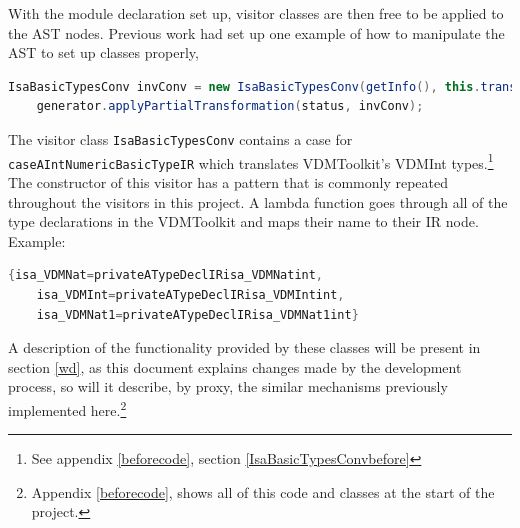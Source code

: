     With the module declaration set up, visitor classes are then free to be applied to the AST nodes. Previous work had set up one example of how to manipulate the AST to set up classes properly, 
    \begin{lstlisting}[language=Java]
    IsaBasicTypesConv invConv = new IsaBasicTypesConv(getInfo(), this.transAssistant, vdmToolkitModuleIR);
    generator.applyPartialTransformation(status, invConv);
    \end{lstlisting}
    The visitor class \lstinline[language=Java]{IsaBasicTypesConv} contains a case for \lstinline[language=Java]{caseAIntNumericBasicTypeIR} which translates VDMToolkit's VDMInt types.\footnote{See appendix \ref{beforecode}, section \ref{IsaBasicTypesConvbefore}} The constructor of this visitor has a pattern that is commonly repeated throughout the visitors in this project. A lambda function goes through all of the type declarations in the VDMToolkit and maps their name to their IR node. Example: 
	\begin{lstlisting}[language=Java]
	{isa_VDMNat=privateATypeDeclIRisa_VDMNatint,  
	isa_VDMInt=privateATypeDeclIRisa_VDMIntint, 
	isa_VDMNat1=privateATypeDeclIRisa_VDMNat1int}
	\end{lstlisting}

	A description of the functionality provided by these classes will be present in section \ref{wd}, as this document explains changes made by the development process, so will it describe, by proxy, the similar mechanisms previously implemented here.\footnote{Appendix \ref{beforecode}, shows all of this code and classes at the start of the project.}

